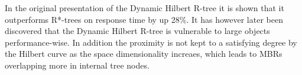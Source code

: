 In the original presentation of the Dynamic Hilbert R-tree it is shown that it outperforms R*-trees on response time by up 28\%\cite{HilbertRTree}. It has however later been discovered that the Dynamic Hilbert R-tree is vulnerable to large objects performance-wise. In addition the proximity is not kept to a satisfying degree by the Hilbert curve as the space dimensionality increaes, which leads to MBRs overlapping more in internal tree nodes\cite{RTreesTheoryApplications}.